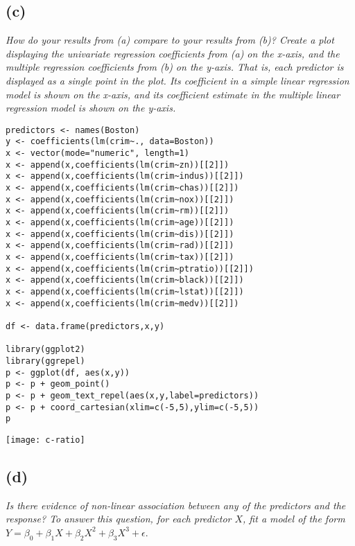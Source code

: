 \documentclass[a4paper,man,natbib]{apa6}
\begin{document}
\subsection{(c)}
\emph{
	How do your results from (a) compare to your results from (b)?
	Create a plot displaying the univariate regression coefficients
	from (a) on the x-axis, and the multiple regression coefficients
	from (b) on the y-axis. That is, each predictor is displayed as a
	single point in the plot. Its coefficient in a simple linear regression model is shown on the x-axis, and its coefficient estimate
	in the multiple linear regression model is shown on the y-axis.
} \\
\begin{verbatim}
predictors <- names(Boston)
y <- coefficients(lm(crim~., data=Boston))
x <- vector(mode="numeric", length=1)
x <- append(x,coefficients(lm(crim~zn))[[2]])
x <- append(x,coefficients(lm(crim~indus))[[2]])
x <- append(x,coefficients(lm(crim~chas))[[2]])
x <- append(x,coefficients(lm(crim~nox))[[2]])
x <- append(x,coefficients(lm(crim~rm))[[2]])
x <- append(x,coefficients(lm(crim~age))[[2]])
x <- append(x,coefficients(lm(crim~dis))[[2]])
x <- append(x,coefficients(lm(crim~rad))[[2]])
x <- append(x,coefficients(lm(crim~tax))[[2]])
x <- append(x,coefficients(lm(crim~ptratio))[[2]])
x <- append(x,coefficients(lm(crim~black))[[2]])
x <- append(x,coefficients(lm(crim~lstat))[[2]])
x <- append(x,coefficients(lm(crim~medv))[[2]])

df <- data.frame(predictors,x,y)

library(ggplot2)
library(ggrepel)
p <- ggplot(df, aes(x,y)) 
p <- p + geom_point() 
p <- p + geom_text_repel(aes(x,y,label=predictors)) 
p <- p + coord_cartesian(xlim=c(-5,5),ylim=c(-5,5))
p
\end{verbatim}
\texttt{[image: c-ratio]}
\subsection{(d)}
\emph{
	Is there evidence of non-linear association between any of the
	predictors and the response? To answer this question, for each
	predictor $X$, fit a model of the form} \\
	$Y = \beta_0 + \beta_1X + \beta_2X^2 + \beta_3X^3 + \epsilon$.
	
\end{document}
